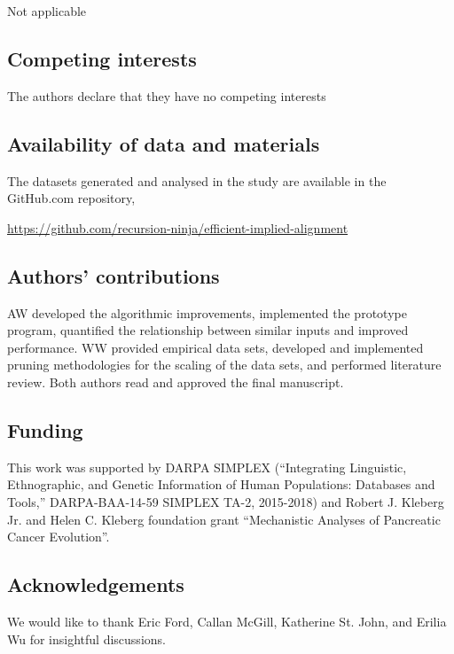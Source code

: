\documentclass{bmcart}
\begin{document}
    Not applicable   

  \subsection*{Competing interests}

    The authors declare that they have no competing interests

  \subsection*{Availability of data and materials}
  
    The datasets generated and analysed in the study are available in the GitHub.com repository,
    
    \centerline{\url{https://github.com/recursion-ninja/efficient-implied-alignment}}

  \subsection*{Authors' contributions}
  
    AW developed the algorithmic improvements, implemented the prototype program, quantified the relationship between similar inputs and improved performance.
    WW provided empirical data sets, developed and implemented pruning methodologies for the scaling of the data sets, and performed literature review.
    Both authors read and approved the final manuscript.
    
  \subsection*{Funding}

    This work was supported by DARPA SIMPLEX (``Integrating Linguistic, Ethnographic, and Genetic Information of Human Populations: Databases and Tools,'' DARPA-BAA-14-59 SIMPLEX TA-2, 2015-2018) and Robert J. Kleberg Jr. and Helen C. Kleberg foundation grant ``Mechanistic Analyses of Pancreatic Cancer Evolution''.

  \subsection*{Acknowledgements}
	
    We would like to thank Eric Ford, Callan McGill, Katherine St. John, and Erilia Wu for insightful discussions.
\end{document}
